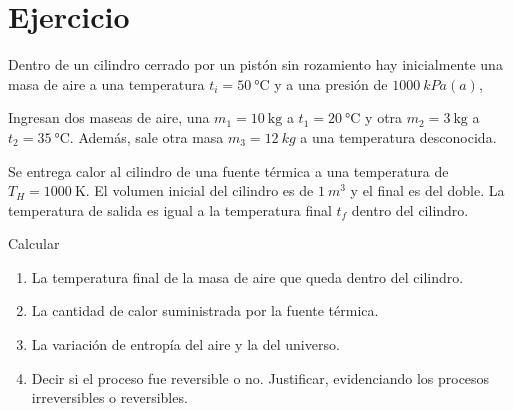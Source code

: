 \section{Ejercicio}\label{ej:Chap07Ejercicio29}
Dentro de un cilindro cerrado por un pistón sin rozamiento hay inicialmente una masa de aire a una temperatura $t_i=\SI{50}{\celsius}$ y a una presión de $\SI{1000}{kPa(a)}$,

Ingresan dos maseas de aire, una $m_1=\SI{10}{\kg}$ a $t_1=\SI{20}{\celsius}$ y otra $m_2=\SI{3}{\kg}$ a $t_2=\SI{35}{\celsius}$. Además, sale otra masa $m_3=\SI{12}{kg}$ a una temperatura desconocida.

Se entrega calor al cilindro de una fuente térmica a una temperatura de $T_H=\SI{1000}{\kelvin}$. El volumen inicial del cilindro es de $\SI{1}{m^3}$ y el final es del doble. La temperatura de salida es igual a la temperatura final $t_f$ dentro del cilindro.

Calcular
\begin{enumerate}
    \item La temperatura final de la masa de aire que queda dentro del cilindro.
    \item La cantidad de calor suministrada por la fuente térmica.
    \item La variación de entropía del aire y la del universo.
    \item Decir si el proceso fue reversible o no. Justificar, evidenciando los procesos irreversibles o reversibles.
\end{enumerate}